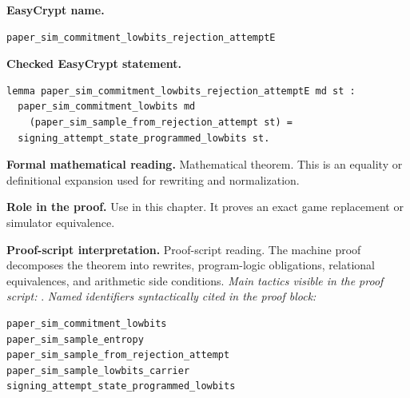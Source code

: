 \begin{formaltheorem}
\noindent\textbf{EasyCrypt name.}
\begin{lstlisting}[language=EasyCrypt,basicstyle=\ttfamily\scriptsize]
paper_sim_commitment_lowbits_rejection_attemptE
\end{lstlisting}
\noindent\textbf{Checked EasyCrypt statement.}
\begin{lstlisting}[language=EasyCrypt,basicstyle=\ttfamily\scriptsize]
lemma paper_sim_commitment_lowbits_rejection_attemptE md st :
  paper_sim_commitment_lowbits md
    (paper_sim_sample_from_rejection_attempt st) =
  signing_attempt_state_programmed_lowbits st.
\end{lstlisting}
\noindent\textbf{Formal mathematical reading.}
Mathematical theorem. This is an equality or definitional expansion used for rewriting and normalization.

\noindent\textbf{Role in the proof.}
Use in this chapter. It proves an exact game replacement or simulator equivalence.

\noindent\textbf{Proof-script interpretation.}
Proof-script reading. The machine proof decomposes the theorem into rewrites, program-logic obligations, relational equivalences, and arithmetic side conditions.
\emph{Main tactics visible in the proof script:} .
\emph{Named identifiers syntactically cited in the proof block:}
\begin{lstlisting}[language=EasyCrypt,basicstyle=\ttfamily\scriptsize]
paper_sim_commitment_lowbits
paper_sim_sample_entropy
paper_sim_sample_from_rejection_attempt
paper_sim_sample_lowbits_carrier
signing_attempt_state_programmed_lowbits
\end{lstlisting}

\end{formaltheorem}

